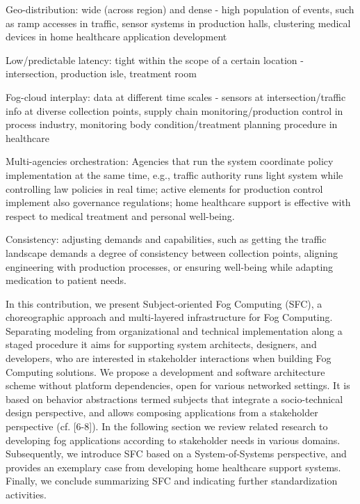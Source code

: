 \begin{list}{-}{spacing}
	\item Geo-distribution: wide (across region) and dense - high population of events, such as ramp accesses in traffic, sensor systems in production halls, clustering medical devices in home healthcare application development
	\item Low/predictable latency: tight within the scope of a certain location - intersection, production isle, treatment room
	\item Fog-cloud interplay: data at different time scales - sensors at intersection/traffic info at diverse collection points, supply chain monitoring/production control in process industry, monitoring body condition/treatment planning procedure in healthcare
	\item Multi-agencies orchestration: Agencies that run the system coordinate policy implementation at the same time, e.g., traffic authority runs light system while controlling law policies in real time; active elements for production control implement also governance regulations; home healthcare support is effective with respect to medical treatment and personal well-being.
	\item Consistency: adjusting demands and capabilities, such as getting the traffic landscape demands a degree of consistency between collection points, aligning engineering with production processes, or ensuring well-being while adapting medication to patient needs.
\end{list}

In this contribution, we present Subject-oriented Fog Computing (SFC), a choreographic approach and multi-layered infrastructure for Fog Computing. Separating modeling from organizational and technical implementation along a staged procedure it aims for supporting system architects, designers, and developers, who are interested in stakeholder interactions when building Fog Computing solutions. We propose a development and software architecture scheme without platform dependencies, open for various networked settings. It is based on behavior abstractions termed subjects that integrate a socio-technical design perspective, and allows composing applications from a stakeholder perspective (cf. [6-8]).
In the following section we review related research to developing fog applications according to stakeholder needs in various domains. Subsequently, we introduce SFC based on a System-of-Systems perspective, and provides an exemplary case from developing home healthcare support systems. Finally, we conclude summarizing SFC and indicating further standardization activities.

